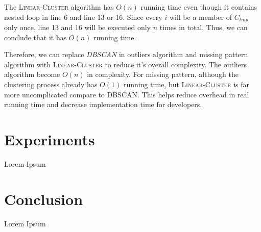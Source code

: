 \documentclass[conference]{IEEEtran}
\begin{document}
The \textsc{Linear-Cluster} algorithm has $O(n)$ running time even though it contains nested loop in line 6 and line 13 or 16. Since every $i$ will be a member of $C_{tmp}$ only once, line 13 and 16 will be executed only $n$ times in total. Thus, we can conclude that it has $O(n)$ running time.

Therefore, we can replace \textit{DBSCAN} in outliers algorithm and missing pattern algorithm with \textsc{Linear-Cluster} to reduce it's overall complexity. The outliers algorithm become $O(n)$ in complexity. For missing pattern, although the clustering process already has $O(1)$ running time, but \textsc{Linear-Cluster} is far more uncomplicated compare to \textsc{DBSCAN}. This helps reduce overhead in real running time and decrease implementation time for developers.


\section{Experiments} \label{sec:xperiments}

Lorem Ipsum

\section{Conclusion} \label{sec:conclusion}

Lorem Ipsum

\end{document}
